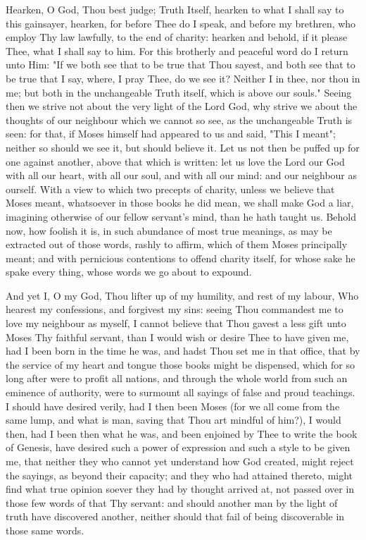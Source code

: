 \documentclass[b5paper,openright,12pt,twoside]{book}
\begin{document}
Hearken, O God, Thou best judge; Truth Itself, hearken to what I shall
say to this gainsayer, hearken, for before Thee do I speak, and before
my brethren, who employ Thy law lawfully, to the end of charity:
hearken and behold, if it please Thee, what I shall say to him. For this
brotherly and peaceful word do I return unto Him: "If we both see that
to be true that Thou sayest, and both see that to be true that I say,
where, I pray Thee, do we see it? Neither I in thee, nor thou in me; but
both in the unchangeable Truth itself, which is above our souls." Seeing
then we strive not about the very light of the Lord God, why strive
we about the thoughts of our neighbour which we cannot so see, as the
unchangeable Truth is seen: for that, if Moses himself had appeared to
us and said, "This I meant"; neither so should we see it, but should
believe it. Let us not then be puffed up for one against another, above
that which is written: let us love the Lord our God with all our heart,
with all our soul, and with all our mind: and our neighbour as ourself.
With a view to which two precepts of charity, unless we believe that
Moses meant, whatsoever in those books he did mean, we shall make God
a liar, imagining otherwise of our fellow servant's mind, than he hath
taught us. Behold now, how foolish it is, in such abundance of most
true meanings, as may be extracted out of those words, rashly to affirm,
which of them Moses principally meant; and with pernicious contentions
to offend charity itself, for whose sake he spake every thing, whose
words we go about to expound.

And yet I, O my God, Thou lifter up of my humility, and rest of my
labour, Who hearest my confessions, and forgivest my sins: seeing Thou
commandest me to love my neighbour as myself, I cannot believe that Thou
gavest a less gift unto Moses Thy faithful servant, than I would wish
or desire Thee to have given me, had I been born in the time he was, and
hadst Thou set me in that office, that by the service of my heart and
tongue those books might be dispensed, which for so long after were to
profit all nations, and through the whole world from such an eminence of
authority, were to surmount all sayings of false and proud teachings. I
should have desired verily, had I then been Moses (for we all come from
the same lump, and what is man, saving that Thou art mindful of him?),
I would then, had I been then what he was, and been enjoined by Thee to
write the book of Genesis, have desired such a power of expression and
such a style to be given me, that neither they who cannot yet understand
how God created, might reject the sayings, as beyond their capacity; and
they who had attained thereto, might find what true opinion soever they
had by thought arrived at, not passed over in those few words of
that Thy servant: and should another man by the light of truth have
discovered another, neither should that fail of being discoverable in
those same words.
\end{document}
